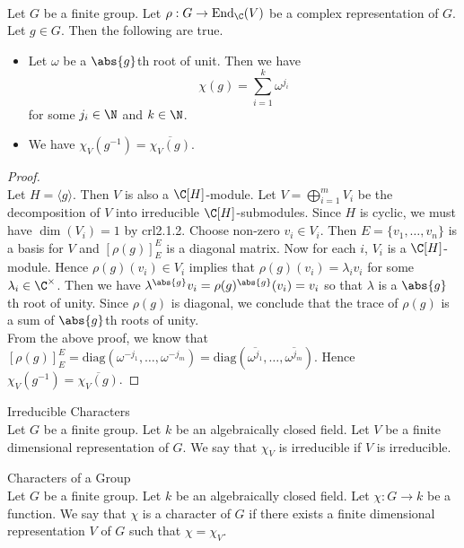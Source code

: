 \documentclass[a4paper]{article}
\begin{document}
\begin{prp}{}{}\\
Let $G$ be a finite group. Let $\rho:G\to\text{End}_\C(V)$ be a complex representation of $G$. Let $g\in G$. Then the following are true. 
\begin{itemize}
\item Let $\omega$ be a $\abs{g}$th root of unit. Then we have $$\chi(g)=\sum_{i=1}^k\omega^{j_i}$$ for some $j_i\in\N$ and $k\in\N$. 
\item We have $\chi_V(g^{-1})=\overline{\chi_V(g)}$. 
\end{itemize}
\begin{proof}\\
Let $H=\langle g\rangle$. Then $V$ is also a $\C[H]$-module. Let $V=\bigoplus_{i=1}^mV_i$ be the decomposition of $V$ into irreducible $\C[H]$-submodules. Since $H$ is cyclic, we must have $\dim(V_i)=1$ by crl2.1.2. Choose non-zero $v_i\in V_i$. Then $E=\{v_1,\dots,v_n\}$ is a basis for $V$ and $[\rho(g)]_E^E$ is a diagonal matrix. Now for each $i$, $V_i$ is a $\C[H]$-module. Hence $\rho(g)(v_i)\in V_i$ implies that $\rho(g)(v_i)=\lambda_iv_i$ for some $\lambda_i\in\C^\times$. Then we have $\lambda^{\abs{g}}v_i=\rho(g)^{\abs{g}}(v_i)=v_i$ so that $\lambda$ is a $\abs{g}$th root of unity. Since $\rho(g)$ is diagonal, we conclude that the trace of $\rho(g)$ is a sum of $\abs{g}$th roots of unity. \\

From the above proof, we know that $[\rho(g)]_E^E=\text{diag}(\omega^{-j_1},\dots,\omega^{-j_m})=\text{diag}(\overline{\omega^{j_1}},\dots,\overline{\omega^{j_m}})$. Hence $\chi_V(g^{-1})=\overline{\chi_V(g)}$. 
\end{proof}
\end{prp}

\begin{defn}{Irreducible Characters}{}\\
Let $G$ be a finite group. Let $k$ be an algebraically closed field. Let $V$ be a finite dimensional representation of $G$. We say that $\chi_V$ is irreducible if $V$ is irreducible. 
\end{defn}

\begin{defn}{Characters of a Group}{}\\
Let $G$ be a finite group. Let $k$ be an algebraically closed field. Let $\chi:G\to k$ be a function. We say that $\chi$ is a character of $G$ if there exists a finite dimensional representation $V$ of $G$ such that $\chi=\chi_V$. 
\end{defn}
\end{document}
